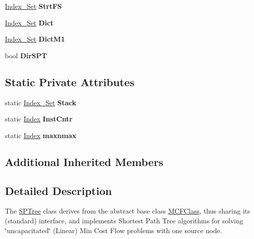\begin{DoxyCompactItemize}
\item 
\mbox{\label{class_s_p_tree_ad3efbad1b61d178e1f790b52733933db}} 
\mbox{\hyperlink{class_m_c_f_class_ace3388eb329ff0551a0b86b6c67e33d8}{Index\+\_\+\+Set}} {\bfseries Strt\+FS}
\item 
\mbox{\label{class_s_p_tree_a7f3cf7b2e322affd5b964daf0117bce9}} 
\mbox{\hyperlink{class_m_c_f_class_ace3388eb329ff0551a0b86b6c67e33d8}{Index\+\_\+\+Set}} {\bfseries Dict}
\item 
\mbox{\label{class_s_p_tree_a2139cbaacd3f423fc54c6bacb9d39529}} 
\mbox{\hyperlink{class_m_c_f_class_ace3388eb329ff0551a0b86b6c67e33d8}{Index\+\_\+\+Set}} {\bfseries Dict\+M1}
\item 
\mbox{\label{class_s_p_tree_a8113a5c9fd2c2726f375a7d27c280bab}} 
bool {\bfseries Dir\+S\+PT}
\end{DoxyCompactItemize}
\subsection*{Static Private Attributes}
\begin{DoxyCompactItemize}
\item 
\mbox{\label{class_s_p_tree_adfcaeabb2d30d66fde9c45e1e66527e0}} 
static \mbox{\hyperlink{class_m_c_f_class_ace3388eb329ff0551a0b86b6c67e33d8}{Index\+\_\+\+Set}} {\bfseries Stack}
\item 
\mbox{\label{class_s_p_tree_a1cffb4f8595e57deaa1b04109cb2723a}} 
static \mbox{\hyperlink{class_m_c_f_class_ad53d6229d7ec28555a9c9c2fd9abf773}{Index}} {\bfseries Inst\+Cntr}
\item 
\mbox{\label{class_s_p_tree_a12063fd3a937ebe681f59237785aa0eb}} 
static \mbox{\hyperlink{class_m_c_f_class_ad53d6229d7ec28555a9c9c2fd9abf773}{Index}} {\bfseries maxnmax}
\end{DoxyCompactItemize}
\subsection*{Additional Inherited Members}


\subsection{Detailed Description}
The \mbox{\hyperlink{class_s_p_tree}{S\+P\+Tree}} class derives from the abstract base class \mbox{\hyperlink{class_m_c_f_class}{M\+C\+F\+Class}}, thus sharing its (standard) interface, and implements Shortest Path Tree algorithms for solving \char`\"{}uncapacitated\char`\"{} (Linear) Min Cost Flow problems with one source node.

